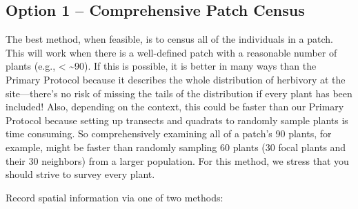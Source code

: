 \documentclass[
  letterpaper,
  oneside,
  open=any]{scrbook}
\begin{document}
\subsection{Option 1 -- Comprehensive Patch
Census}\label{option-1-comprehensive-patch-census}

The best method, when feasible, is to census all of the individuals in a
patch. This will work when there is a well-defined patch with a
reasonable number of plants (e.g., \textless{} \textasciitilde90). If
this is possible, it is better in many ways than the Primary Protocol
because it describes the whole distribution of herbivory at the
site---there's no risk of missing the tails of the distribution if every
plant has been included! Also, depending on the context, this could be
faster than our Primary Protocol because setting up transects and
quadrats to randomly sample plants is time consuming. So comprehensively
examining all of a patch's 90 plants, for example, might be faster than
randomly sampling 60 plants (30 focal plants and their 30 neighbors)
from a larger population. For this method, we stress that you should
strive to survey every plant.

Record spatial information via one of two methods:
\end{document}
